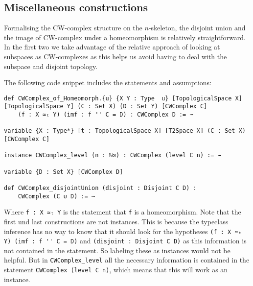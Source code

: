 \subsection{Miscellaneous constructions}

Formalising the CW-complex structure on the $n$-skeleton, the disjoint union and the image of CW-complex under a homeomorphism is relatively straightforward. 
In the first two we take advantage of the relative approach of looking at subspaces as CW-complexes as this helps us avoid having to deal with the subspace and disjoint topology. 

The following code snippet includes the statements and assumptions:

\begin{lstlisting}
def CWComplex_of_Homeomorph.{u} {X Y : Type  u} [TopologicalSpace X] [TopologicalSpace Y] (C : Set X) (D : Set Y) [CWComplex C] 
    (f : X ≃ₜ Y) (imf : f '' C = D) : CWComplex D := ⋯

variable {X : Type*} [t : TopologicalSpace X] [T2Space X] (C : Set X) [CWComplex C]

instance CWComplex_level (n : ℕ∞) : CWComplex (level C n) := ⋯

variable {D : Set X} [CWComplex D] 

def CWComplex_disjointUnion (disjoint : Disjoint C D) : 
    CWComplex (C ∪ D) := ⋯
\end{lstlisting}

Where \lstinline{f : X ≃ₜ Y} is the statement that \lstinline{f} is a homeomorphism. 
Note that the first und last constructions are not instances.
This is because the typeclass inference has no way to know that it should look for the hypotheses \lstinline{(f : X ≃ₜ Y) (imf : f '' C = D)} and \lstinline{(disjoint : Disjoint C D)} as this information is not contained in the statement. 
So labeling these as instances would not be helpful. 
But in \lstinline{CWComplex_level} all the necessary information is contained in the statement \lstinline{CWComplex (level C n)}, which means that this will work as an instance.
